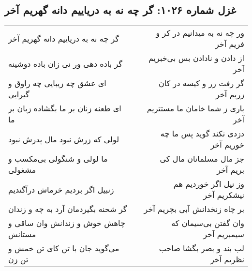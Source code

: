 \begin{center}
\section*{غزل شماره ۱۰۲۶: گر چه نه به دریاییم دانه گهریم آخر}
\label{sec:1026}
\begin{longtable}{l p{0.5cm} r}
گر چه نه به دریاییم دانه گهریم آخر
&&
ور چه نه به میدانیم در کر و فریم آخر
\\
گر باده دهی ور نی زان باده دوشینه
&&
از دادن و نادادن بس بی‌خبریم آخر
\\
ای عشق چه زیبایی چه راوق و گیرایی
&&
گر رفت زر و کیسه در کان زریم آخر
\\
ای طعنه زنان بر ما بگشاده زبان بر ما
&&
باری ز شما خامان ما مستتریم آخر
\\
لولی که زرش نبود مال پدرش نبود
&&
دزدی نکند گوید پس ما چه خوریم آخر
\\
ما لولی و شنگولی بی‌مکسب و مشغولی
&&
جز مال مسلمانان مال کی بریم آخر
\\
زنبیل اگر بردیم خرماش درآگندیم
&&
وز نیل اگر خوردیم هم نیشکریم آخر
\\
گر شحنه بگیردمان آرد به چه و زندان
&&
بر چاه زنخدانش آبی بچریم آخر
\\
چاهش خوش و زندانش وان ساقی و مستانش
&&
وان گفتن بی‌سیمان که سیمبریم آخر
\\
می‌گوید جان با تن کای تن خمش و تن زن
&&
لب بند و بصر بگشا صاحب نظریم آخر
\\
\end{longtable}
\end{center}

